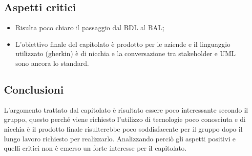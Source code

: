 \subsection{Aspetti critici}
\begin{itemize}
\item Risulta poco chiaro il passaggio dal BDL al BAL;
\item L'obiettivo finale del capitolato \`e prodotto per le aziende e il linguaggio utilizzato (gherkin) \`e di
nicchia e la conversazione tra stakeholder e UML sono ancora lo standard.
\end{itemize}

\subsection{Conclusioni}
L'argomento trattato dal capitolato \`e risultato essere poco interessante secondo il gruppo, questo perch\'e viene richiesto l'utilizzo di tecnologie poco conosciuta e di nicchia \`e il prodotto finale risulterebbe poco soddisfacente per il gruppo dopo il lungo lavoro richiesto per realizzarlo. Analizzando perci\`o gli aspetti positivi e quelli critici non \`e emerso un forte interesse per il capitolato.